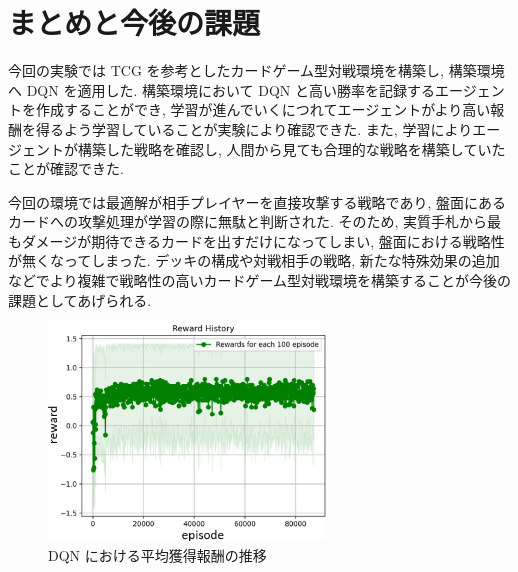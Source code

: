 \documentclass[twocolumn]{jarticle}
\begin{document}
\section{まとめと今後の課題}
今回の実験では TCG を参考としたカードゲーム型対戦環境を構築し, 構築環境へ DQN を適用した. 構築環境において DQN と高い勝率を記録するエージェントを作成することができ, 学習が進んでいくにつれてエージェントがより高い報酬を得るよう学習していることが実験により確認できた. また, 学習によりエージェントが構築した戦略を確認し, 人間から見ても合理的な戦略を構築していたことが確認できた.
\par
今回の環境では最適解が相手プレイヤーを直接攻撃する戦略であり, 盤面にあるカードへの攻撃処理が学習の際に無駄と判断された. そのため, 実質手札から最もダメージが期待できるカードを出すだけになってしまい, 盤面における戦略性が無くなってしまった. デッキの構成や対戦相手の戦略, 新たな特殊効果の追加などでより複雑で戦略性の高いカードゲーム型対戦環境を構築することが今後の課題としてあげられる.

\begin{figure}[t]
  \centering
  \small
  \includegraphics[width=73.5mm]{assets/DQN_update.eps}
  \caption{DQN における平均獲得報酬の推移}
  \label{fig:DQNresult}
\end{figure}






\end{document}
